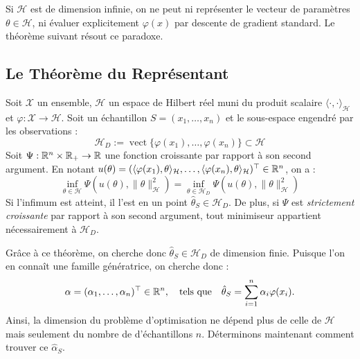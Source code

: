 \begin{remark}
    Si $\mathcal{H}$ est de dimension infinie, on ne peut ni représenter le vecteur de paramètres $\theta \in \mathcal{H}$, ni évaluer explicitement $\varphi(x)$ par descente de gradient standard. Le théorème suivant résout ce paradoxe.
\end{remark}

\subsection{Le Théorème du Représentant}

\begin{theorem}
    Soit $\mathcal{X}$ un ensemble, $\mathcal{H}$ un espace de Hilbert réel muni du produit scalaire $\langle \cdot, \cdot \rangle_{\mathcal{H}}$ et $\varphi : \mathcal{X} \to \mathcal{H}$. Soit un échantillon $S = (x_1, \dots, x_n)$ et le sous-espace engendré par les observations :
    \begin{equation}
        \mathcal{H}_D := \operatorname{vect}\{\varphi(x_1), \dots, \varphi(x_n)\} \subset \mathcal{H}
    \end{equation}
    Soit $\Psi : \mathbb{R}^n \times \mathbb{R}_+ \to \mathbb{R}$ une fonction croissante par rapport à son second argument. En notant $u(\theta) = (\langle \varphi(x_1), \theta \rangle_{\mathcal{H}}, \dots, \langle \varphi(x_n), \theta \rangle_{\mathcal{H}})^\top \in \mathbb{R}^n$, on a :
    \begin{equation}
        \inf_{\theta \in \mathcal{H}} \Psi\left(u(\theta), \|\theta\|_{\mathcal{H}}^2\right) = \inf_{\theta \in \mathcal{H}_D} \Psi\left(u(\theta), \|\theta\|_{\mathcal{H}}^2\right)
    \end{equation}
    Si l'infimum est atteint, il l'est en un point $\hat{\theta}_S \in \mathcal{H}_D$. De plus, si $\Psi$ est \emph{strictement croissante} par rapport à son second argument, tout minimiseur appartient nécessairement à $\mathcal{H}_D$.
\end{theorem}


Grâce à ce théorème, on cherche donc $ \hat{ \theta}_S \in \mathcal{H}_D$ de dimension finie. Puisque l'on en connaît une famille génératrice, on cherche donc : 
$$ \alpha = ( \alpha_1, \dots, \alpha_n )^\top \in \mathbb{R}^n, \quad \text{tels que} \quad \hat{ \theta}_S = \sum_{i=1}^{n} \alpha_i \varphi(x_i). $$
Ainsi, la dimension du problème d'optimisation ne dépend plus de celle de $ \mathcal{H}$ mais seulement du nombre de d'échantillons $n$. Déterminons maintenant comment trouver ce $ \hat{ \alpha}_S$. 

